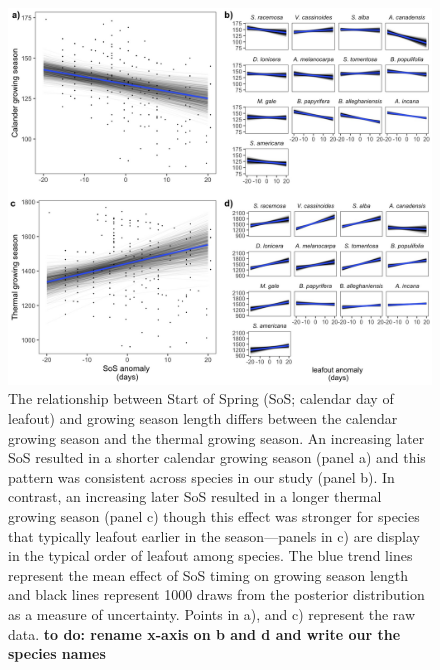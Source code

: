 \documentclass{article}[12pt]
\begin{document}
\begin{figure}[h!]
    \centering
 \includegraphics[width=.8\textwidth]{..//analyses/figures/primarygrowingseason_modplots.jpeg}
    \caption{The relationship between Start of Spring (SoS; calendar day of leafout) and growing season length differs between the calendar growing season and the thermal growing season. An increasing later SoS resulted in a shorter calendar growing season (panel a) and this pattern was consistent across species in our study (panel b). In contrast, an increasing later SoS resulted in a longer thermal growing season (panel c) though this effect was stronger for species that typically leafout earlier in the season---panels in c) are display in the typical order of leafout among species. The blue trend lines represent the mean effect of SoS timing on growing season length and black lines represent 1000 draws from the posterior distribution as a measure of uncertainty. Points in a), and c) represent the raw data. \textbf{to do: rename x-axis on b and d and write our the species names}}
    \label{fig:thermcal}
\end{figure}
\end{document}
